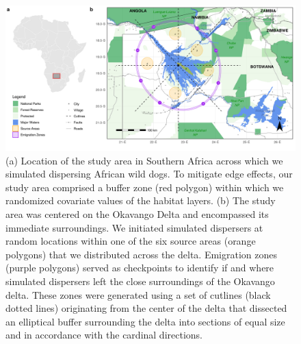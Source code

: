 \documentclass[abstract=on,10pt,a4paper,bibliography=totocnumbered]{article}
\begin{document}
\begin{figure}
  \begin{center}
  \includegraphics[width = \textwidth]{99_StudyArea.png}
  \caption{(a) Location of the study area in Southern Africa across which we
  simulated dispersing African wild dogs. To mitigate edge effects, our study
  area comprised a buffer zone (red polygon) within which we randomized
  covariate values of the habitat layers. (b) The study area was centered on the
  Okavango Delta and encompassed its immediate surroundings. We initiated
  simulated dispersers at random locations within one of the six source areas
  (orange polygons) that we distributed across the delta. Emigration zones
  (purple polygons) served as checkpoints to identify if and where simulated
  dispersers left the close surroundings of the Okavango delta. These zones were
  generated using a set of cutlines (black dotted lines) originating from the
  center of the delta that dissected an elliptical buffer surrounding the delta
  into sections of equal size and in accordance with the cardinal directions.}
  \label{StudyArea}
  \end{center}
\end{figure}
\end{document}
